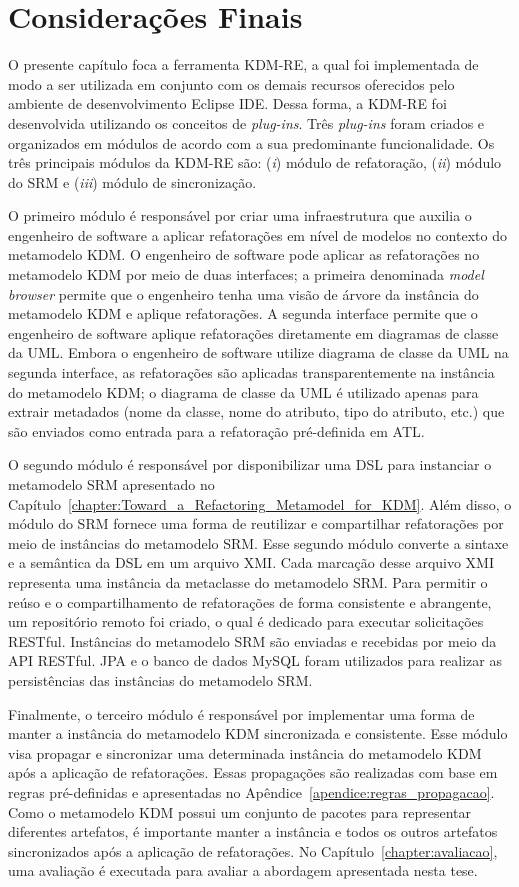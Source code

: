 \section{Considerações Finais}\label{sec:consideracoes_final_kdm_re}


O presente capítulo foca a ferramenta KDM-RE, a qual foi implementada de modo a ser utilizada em conjunto com os demais recursos oferecidos pelo ambiente de desenvolvimento Eclipse IDE. Dessa forma, a KDM-RE foi desenvolvida utilizando os conceitos de \textit{plug-ins}. Três \textit{plug-ins} foram criados e organizados em módulos de acordo com a sua predominante funcionalidade. Os três principais módulos da KDM-RE são: (\textit{i}) módulo de refatoração, (\textit{ii}) módulo do SRM e (\textit{iii}) módulo de sincronização. 

O primeiro módulo é responsável por criar uma infraestrutura que auxilia o engenheiro de software a aplicar refatorações em nível de modelos no contexto do metamodelo KDM. O engenheiro de software pode aplicar as refatorações no metamodelo KDM por meio de duas interfaces; a primeira denominada \textit{model browser} permite que o engenheiro tenha uma visão de árvore da instância do metamodelo KDM e aplique refatorações. A segunda interface permite que o engenheiro de software aplique refatorações diretamente em diagramas de classe da UML. Embora o engenheiro de software utilize diagrama de classe da UML na segunda interface, as refatorações são aplicadas transparentemente na instância do metamodelo KDM; o diagrama de classe da UML é utilizado apenas para extrair metadados (nome da classe, nome do atributo, tipo do atributo, etc.) que são enviados como entrada para a refatoração pré-definida em ATL.

O segundo módulo é responsável por disponibilizar uma DSL para instanciar o metamodelo SRM apresentado no Capítulo~\ref{chapter:Toward_a_Refactoring_Metamodel_for_KDM}. Além disso, o módulo do SRM fornece uma forma de reutilizar e compartilhar refatorações por meio de instâncias do metamodelo SRM. Esse segundo módulo converte a sintaxe e a semântica da DSL em um arquivo XMI. Cada marcação desse arquivo XMI representa uma instância da metaclasse do metamodelo SRM. Para permitir o reúso e o compartilhamento de refatorações de forma consistente e abrangente, um repositório remoto foi criado, o qual é dedicado para executar solicitações RESTful. Instâncias do metamodelo SRM são enviadas e recebidas por meio da API RESTful. JPA e o banco de dados MySQL foram utilizados para realizar as persistências das instâncias do metamodelo SRM.

Finalmente, o terceiro módulo é responsável por implementar uma forma de manter a instância do metamodelo KDM sincronizada e consistente. Esse módulo visa propagar e sincronizar uma determinada instância do metamodelo KDM após a aplicação de refatorações. Essas propagações são realizadas com base em regras pré-definidas e apresentadas no Apêndice~\ref{apendice:regras_propagacao}. Como o metamodelo KDM possui um conjunto de pacotes para representar diferentes artefatos, é importante manter a instância e todos os outros artefatos sincronizados após a aplicação de refatorações. No Capítulo~\ref{chapter:avaliacao}, uma avaliação é executada para avaliar a abordagem apresentada nesta tese.